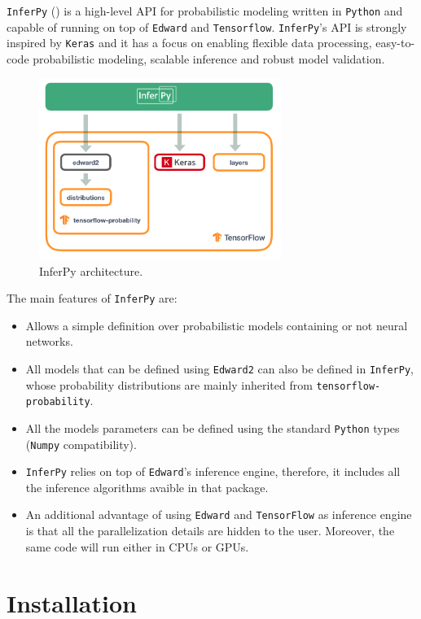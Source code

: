 
\texttt{InferPy} (\cite{cozar2019inferpy}) is a high-level API for probabilistic modeling written in \texttt{Python} and capable of running on top of \texttt{Edward} and \texttt{Tensorflow}. \texttt{InferPy}'s API is strongly inspired by \texttt{Keras} and it has a focus on enabling flexible data processing, easy-to-code probabilistic modeling, scalable inference and robust model validation.

\begin{figure}[h!]
    \centering
    \includegraphics[width=0.7\textwidth]{tex/images/arch.png}
    \caption{InferPy architecture.}
\end{figure}

The main features of \texttt{InferPy} are:
\begin{itemize}
    \item Allows a simple definition over probabilistic models containing or not neural networks.
    \item All models that can be defined using \texttt{Edward2} can also be defined in  \texttt{InferPy}, whose probability distributions are mainly inherited from \texttt{tensorflow-probability}.
    \item All the models parameters can be defined using the standard \texttt{Python} types (\texttt{Numpy} compatibility).
    \item \texttt{InferPy} relies on top of \texttt{Edward}'s inference engine, therefore, it includes all the inference algorithms avaible in that package.
    \item An additional advantage of using \texttt{Edward} and \texttt{TensorFlow} as inference engine is that all the parallelization details are hidden to the user. Moreover, the same code will run either in CPUs or GPUs.
\end{itemize}

\section{Installation}

